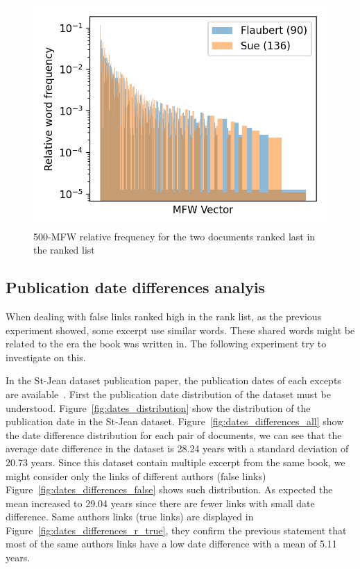 \begin{figure}
  \includegraphics[width=\linewidth]{img/mfw_vector_last_rl.png}
  \caption{500-MFW relative frequency for the two documents ranked last in the ranked list}
  \label{fig:mfw_vector_last_rl}
\end{figure}

\subsection{Publication date differences analyis}

When dealing with false links ranked high in the rank list, as the previous experiment showed, some excerpt use similar words.
These shared words might be related to the era the book was written in.
The following experiment try to investigate on this.

In the St-Jean dataset publication paper, the publication dates of each excepts are available~\cite{st_jean}.
First the publication date distribution of the dataset must be understood.
Figure~\ref{fig:dates_distribution} show the distribution of the publication date in the St-Jean dataset.
Figure~\ref{fig:dates_differences_all} show the date difference distribution for each pair of documents, we can see that the average date difference in the dataset is 28.24 years with a standard deviation of 20.73 years.
Since this dataset contain multiple excerpt from the same book, we might consider only the links of different authors (false links) Figure~\ref{fig:dates_differences_false} shows such distribution.
As expected the mean increased to 29.04 years since there are fewer links with small date difference.
Same authors links (true links) are displayed in Figure~\ref{fig:dates_differences_r_true}, they confirm the previous statement that most of the same authors links have a low date difference with a mean of 5.11 years.


